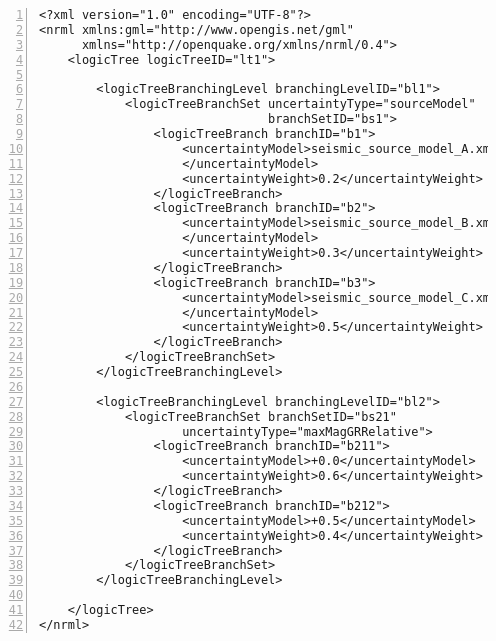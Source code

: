 \begin{Verbatim}[frame=single, commandchars=\\\{\}, fontsize=\small,
    firstnumber=1, numbers=left, numbersep=2pt]
<?xml version="1.0" encoding="UTF-8"?>
<nrml xmlns:gml="http://www.opengis.net/gml"
      xmlns="http://openquake.org/xmlns/nrml/0.4">
    <logicTree logicTreeID="lt1">

        <logicTreeBranchingLevel branchingLevelID="bl1">
            <logicTreeBranchSet uncertaintyType="sourceModel"
                                branchSetID="bs1">
                <logicTreeBranch branchID="b1">
                    <uncertaintyModel>seismic_source_model_A.xml
                    </uncertaintyModel>
                    <uncertaintyWeight>0.2</uncertaintyWeight>
                </logicTreeBranch>
                <logicTreeBranch branchID="b2">
                    <uncertaintyModel>seismic_source_model_B.xml
                    </uncertaintyModel>
                    <uncertaintyWeight>0.3</uncertaintyWeight>
                </logicTreeBranch>
                <logicTreeBranch branchID="b3">
                    <uncertaintyModel>seismic_source_model_C.xml
                    </uncertaintyModel>
                    <uncertaintyWeight>0.5</uncertaintyWeight>
                </logicTreeBranch>
            </logicTreeBranchSet>
        </logicTreeBranchingLevel>

        <logicTreeBranchingLevel branchingLevelID="bl2">
            <logicTreeBranchSet branchSetID="bs21" 
                    uncertaintyType="maxMagGRRelative">
                <logicTreeBranch branchID="b211">
                    <uncertaintyModel>+0.0</uncertaintyModel>
                    <uncertaintyWeight>0.6</uncertaintyWeight>
                </logicTreeBranch>
                <logicTreeBranch branchID="b212">
                    <uncertaintyModel>+0.5</uncertaintyModel>
                    <uncertaintyWeight>0.4</uncertaintyWeight>
                </logicTreeBranch>
            </logicTreeBranchSet>
        </logicTreeBranchingLevel>

    </logicTree>
</nrml>
\end{Verbatim}

